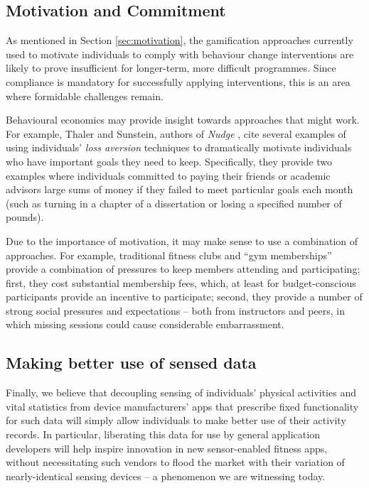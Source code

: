 \documentclass{sig-alternate}
\begin{document}

\subsection{Motivation and Commitment}

As mentioned in Section \ref{sec:motivation}, the gamification
approaches currently used to motivate individuals to comply with
behaviour change interventions are likely to prove insufficient for
longer-term, more difficult programmes. Since compliance is mandatory
for successfully applying interventions, this is an area where
formidable challenges remain.

Behavioural economics may provide insight towards approaches that
might work.  For example, Thaler and Sunstein, authors of \emph{Nudge}
\cite{thaler2008nudge}, cite several examples of using individuals' \emph{loss
  aversion} techniques to dramatically motivate individuals who have
important goals they need to keep.  Specifically, they provide two
examples where individuals committed to paying their friends or
academic advisors large sums of money if they failed to meet
particular goals each month (such as turning in a chapter of a
dissertation or losing a specified number of pounds).

Due to the importance of motivation, it may make sense to use a
combination of approaches.  For example, traditional fitness clubs and
``gym memberships'' provide a combination of pressures to keep members
attending and participating; first, they cost substantial membership
fees, which, at least for budget-conscious participants provide an
incentive to participate; second, they provide a number of strong
social pressures and expectations -- both from instructors and peers,
in which missing sessions could cause considerable embarrassment.

\subsection{Making better use of sensed data }

Finally, we believe that decoupling sensing of individuals' physical
activities and vital statistics from device manufacturers' apps that
prescribe fixed functionality for such data will simply allow
individuals to make better use of their activity records.  In
particular, liberating this data for use by general application
developers will help inspire innovation in new sensor-enabled fitness
apps, without necessitating such vendors to flood the market with
their variation of nearly-identical sensing devices -- a phenomenon we
are witnessing today.
\end{document}
